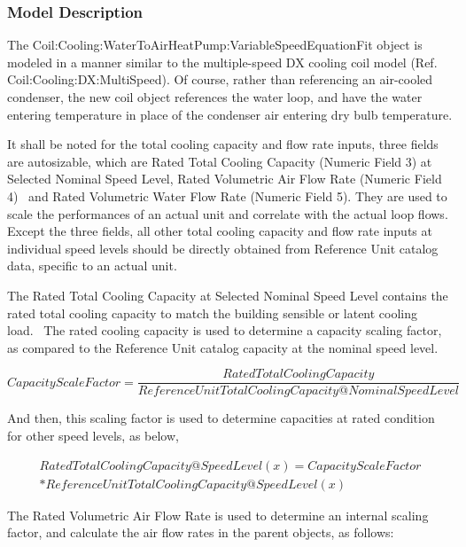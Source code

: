 \subsubsection{Model Description}\label{model-description-11}

The Coil:Cooling:WaterToAirHeatPump:VariableSpeedEquationFit object is modeled in a manner similar to the multiple-speed DX cooling coil model (Ref. Coil:Cooling:DX:MultiSpeed). Of course, rather than referencing an air-cooled condenser, the new coil object references the water loop, and have the water entering temperature in place of the condenser air entering dry bulb temperature.

It shall be noted for the total cooling capacity and flow rate inputs, three fields are autosizable, which are Rated Total Cooling Capacity (Numeric Field 3) at Selected Nominal Speed Level, Rated Volumetric Air Flow Rate (Numeric Field 4) ~and Rated Volumetric Water Flow Rate (Numeric Field 5). They are used to scale the performances of an actual unit and correlate with the actual loop flows. Except the three fields, all other total cooling capacity and flow rate inputs at individual speed levels should be directly obtained from Reference Unit catalog data, specific to an actual unit.

The Rated Total Cooling Capacity at Selected Nominal Speed Level contains the rated total cooling capacity to match the building sensible or latent cooling load.~ The rated cooling capacity is used to determine a capacity scaling factor, as compared to the Reference Unit catalog capacity at the nominal speed level.

\begin{equation}
CapacityScaleFactor = \frac{{RatedTotalCoolingCapacity}}{{ReferenceUnitTotalCoolingCapacity@NominalSpeedLevel}}
\end{equation}

And then, this scaling factor is used to determine capacities at rated condition for other speed levels, as below,

\begin{equation}
\begin{split}
  RatedTotalCoolingCapacity@SpeedLevel(x) = CapacityScaleFactor \\
  * ReferenceUnitTotalCoolingCapacity@SpeedLevel(x)
\end{split}
\end{equation}

The Rated Volumetric Air Flow Rate is used to determine an internal scaling factor, and calculate the air flow rates in the parent objects, as follows:

